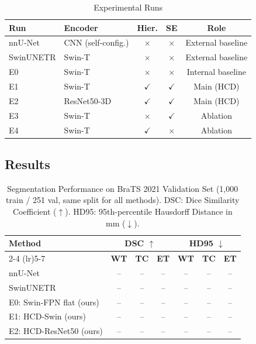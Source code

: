 \documentclass[conference]{IEEEtran}
\begin{document}
\begin{table}[htbp]
\caption{Experimental Runs}
\label{tab:configs}
\begin{center}
\begin{tabular}{llccc}
\toprule
\textbf{Run} & \textbf{Encoder} & \textbf{Hier.} & \textbf{SE} & \textbf{Role} \\
\midrule
nnU-Net          & CNN (self-config.)       & $\times$     & $\times$     & External baseline \\
SwinUNETR        & Swin-T                   & $\times$     & $\times$     & External baseline \\
\midrule
E0               & Swin-T                   & $\times$     & $\times$     & Internal baseline \\
\midrule
E1               & Swin-T                   & $\checkmark$ & $\checkmark$ & Main (HCD) \\
E2               & ResNet50-3D              & $\checkmark$ & $\checkmark$ & Main (HCD) \\
\midrule
E3               & Swin-T                   & $\times$     & $\checkmark$ & Ablation \\
E4               & Swin-T                   & $\checkmark$ & $\times$     & Ablation \\
\bottomrule
\end{tabular}
\end{center}
\end{table}

\subsection{Results}

\begin{table}[htbp]
\caption{Segmentation Performance on BraTS 2021 Validation Set
(1,000 train / 251 val, same split for all methods).
DSC: Dice Similarity Coefficient ($\uparrow$).
HD95: 95th-percentile Hausdorff Distance in mm ($\downarrow$).}
\label{tab:results}
\begin{center}
\setlength{\tabcolsep}{3pt}
\begin{tabular}{lcccccc}
\toprule
\multirow{2}{*}{\textbf{Method}} &
\multicolumn{3}{c}{\textbf{DSC} $\uparrow$} &
\multicolumn{3}{c}{\textbf{HD95} $\downarrow$} \\
\cmidrule(lr){2-4} \cmidrule(lr){5-7}
& \textbf{WT} & \textbf{TC} & \textbf{ET}
& \textbf{WT} & \textbf{TC} & \textbf{ET} \\
\midrule
nnU-Net \cite{isensee_3dunet}
  & {--} & {--} & {--} & {--} & {--} & {--} \\
SwinUNETR \cite{swinunetr}
  & {--} & {--} & {--} & {--} & {--} & {--} \\
E0: Swin-FPN flat (ours) & {--} & {--} & {--} & {--} & {--} & {--} \\
\midrule
E1: HCD-Swin (ours)      & {--} & {--} & {--} & {--} & {--} & {--} \\
E2: HCD-ResNet50 (ours)  & {--} & {--} & {--} & {--} & {--} & {--} \\
\bottomrule
\end{tabular}
\end{center}
\end{table}
\end{document}

